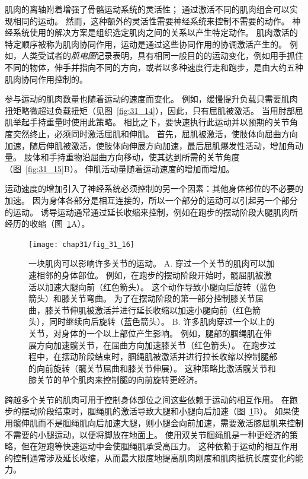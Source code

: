 肌肉的离轴附着增强了骨骼运动系统的灵活性；
通过激活不同的肌肉组合可以实现相同的运动。
然而，这种额外的灵活性需要神经系统来控制不需要的动作。
神经系统使用的解决方案是组织选定肌肉之间的关系以产生特定动作。
肌肉激活的特定顺序被称为肌肉协同作用，运动是通过这些协同作用的协调激活产生的。
例如，人类受试者的\textit{肌电图}记录表明，具有相同一般目的的运动变化，例如用手抓住不同的物体，伸手并指向不同的方向，或者以多种速度行走和跑步，是由大约五种肌肉协同作用控制的。


参与运动的肌肉数量也随着运动的速度而变化。
例如，缓慢提升负载只需要肌肉扭矩略微超过负载扭矩（见图~\ref{fig:31_14}），因此，只有屈肌被激活。
当用肘部屈肌举起手持重量时使用此策略。
相比之下，要快速执行此运动并以预期的关节角度突然终止，必须同时激活屈肌和伸肌。
首先，屈肌被激活，使肢体向屈曲方向加速，随后伸肌被激活，使肢体向伸展方向加速，最后屈肌爆发性活动，增加角动量。
肢体和手持重物沿屈曲方向移动，使其达到所需的关节角度（图~\ref{fig:31_15}B）。 
伸肌活动量随着运动速度的增加而增加。


运动速度的增加引入了神经系统必须控制的另一个因素：其他身体部位的不必要的加速。
因为身体各部分是相互连接的，所以一个部分的运动可以引起另一个部分的运动。
诱导运动通常通过延长收缩来控制，例如在跑步的摆动阶段大腿肌肉所经历的收缩（图~\ref{fig:31_16}A）。


\begin{figure}[htbp]
	\centering
	\texttt{[image: chap31/fig\_31\_16]}
	\caption{一块肌肉可以影响许多关节的运动。
	A. 穿过一个关节的肌肉可以加速相邻的身体部位。
	例如，在跑步的摆动阶段开始时，髋屈肌被激活以加速大腿向前（红色箭头）。
	这个动作导致小腿向后旋转（蓝色箭头）和膝关节弯曲。
	为了在摆动阶段的第一部分控制膝关节屈曲，膝关节伸肌被激活并进行延长收缩以加速小腿向前（红色箭头），同时继续向后旋转（蓝色箭头）。
	B. 许多肌肉穿过一个以上的关节，对身体的一个以上部位产生影响。
	例如，腿部的腘绳肌在伸展方向加速髋关节，在屈曲方向加速膝关节（红色箭头）。
	在跑步过程中，在摆动阶段结束时，腘绳肌被激活并进行拉长收缩以控制腿部的向前旋转（髋关节屈曲和膝关节伸展）。
	这种策略比激活髋关节和膝关节的单个肌肉来控制腿的向前旋转更经济。}
	\label{fig:31_16}
\end{figure}


跨越多个关节的肌肉可用于控制身体部位之间这些依赖于运动的相互作用。
在跑步的摆动阶段结束时，腘绳肌的激活导致大腿和小腿向后加速（图~\ref{fig:31_16}B）。
如果使用髋伸肌而不是腘绳肌向后加速大腿，则小腿会向前加速，需要激活膝屈肌来控制不需要的小腿运动，以便将脚放在地面上。
使用双关节腘绳肌是一种更经济的策略，但在短跑等快速运动中会使腘绳肌承受高压力。
这种依赖于运动的相互作用的控制通常涉及延长收缩，从而最大限度地提高肌肉刚度和肌肉抵抗长度变化的能力。


